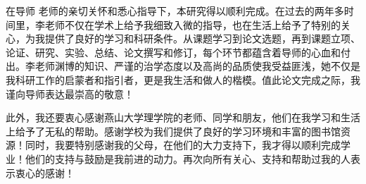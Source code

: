\begin{thanks}

在导师   老师的亲切关怀和悉心指导下，本研究得以顺利完成。在过去的两年多时间里，李老师不仅在学术上给予我细致入微的指导，也在生活上给予了特别的关心，为我提供了良好的学习和科研条件。从课题学习到论文选题，再到课题立项、论证、研究、实验、总结、论文撰写和修订，每个环节都蕴含着导师的心血和付出。李老师渊博的知识、严谨的治学态度以及高尚的品质使我受益匪浅，她不仅是我科研工作的启蒙者和指引者，更是我生活和做人的楷模。值此论文完成之际，我谨向导师表达最崇高的敬意！

此外，我还要衷心感谢燕山大学理学院的老师、同学和朋友，他们在我学习和生活上给予了无私的帮助。感谢学校为我们提供了良好的学习环境和丰富的图书馆资源！同时，我要特别感谢我的父母，在他们的大力支持下，我才得以顺利完成学业！他们的支持与鼓励是我前进的动力。再次向所有关心、支持和帮助过我的人表示衷心的感谢！

\end{thanks}

